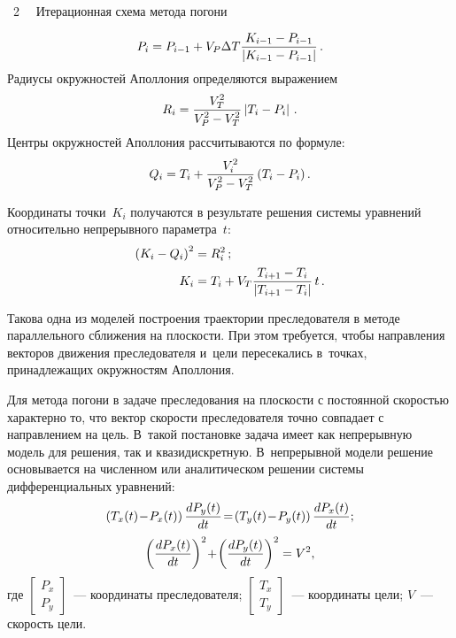    \begin{multicols}{2}
   
   { \begin{center}  %
 \vspace*{-3pt}
     \mbox{%
\epsfxsize=60.497mm
}

\vspace*{6pt}


\noindent
{{\figurename~2}\ \ \small{
Итерационная схема метода погони
}}
\end{center}}

\vspace*{8pt}

\addtocounter{figure}{1}
   
  
   
  \noindent
      $$
  P_i= P_{i-1} +V_P \Delta T \displaystyle\frac{\displaystyle K_{i-1} -P_{i-1}\mathstrut}{\displaystyle \vert K_{i-1} -P_{i-1}\vert\mathstrut}\,.
  $$
    Радиусы окружностей Аполлония определяются выражением
  $$
  R_i= \displaystyle\frac{\displaystyle V_T^2\mathstrut}{\displaystyle V_P^2-V_T^2\mathstrut}\left\vert T_i - P_i\right\vert\,.
  $$
    Центры окружностей Аполлония рассчитываются по формуле:
  $$
  Q_i= T_i +\displaystyle\frac{\displaystyle V_i^2\mathstrut}{\displaystyle V_P^2 -V_T^2\mathstrut}\left( T_i -P_i\right).
  $$
  
  Координаты точки~$K_i$ получаются в результате решения системы 
уравнений относительно непрерывного параметра~$t$:
  \begin{align*}
  \left(K_i-Q_i\right)^2 &=R_i^2\,;\\
  K_i&=T_i +V_T \displaystyle\frac{\displaystyle T_{i+1} -T_i\mathstrut}{\displaystyle \vert T_{i+1} -T_i\vert\mathstrut}\,t\,.
  \end{align*}
  
  Такова одна из моделей построения траектории преследователя в методе 
параллельного сближения на плоскости. При этом требуется, чтобы 
на\-прав\-ле\-ния векторов движения пре\-сле\-до\-ва\-те\-ля и~цели пересекались в~точках, 
при\-над\-ле\-жа\-щих окруж\-но\-стям Аполлония. 
  
  Для метода погони в задаче преследования на плоскости с постоянной 
скоростью характерно то, что вектор скорости преследователя точно совпадает 
с направлением на цель. В~такой постановке задача имеет как непрерывную 
модель для решения, так и квазидискретную. В~непрерывной модели решение 
основывается на численном или аналитическом решении системы 
дифференциальных уравнений:
  \begin{gather}
  \left(T_x(t)\!-\!P_x(t)\right) \fr{dP_y(t)}{dt} \!=\!\left( T_y(t)\!-\!P_y(t)\right) 
\fr{dP_x(t)}{dt};
\label{e1-dub}\\
  \left( \fr{dP_x(t)}{dt}\right)^2 \!+\!\left( \fr{dP_y(t)}{dt}\right)^2 =V^2,
  \label{e2-dub}
  \end{gather}
где $\begin{bmatrix} P_x \\ P_y \end{bmatrix}$~--- координаты преследователя; 
$\begin{bmatrix} T_x\\ T_y \end{bmatrix}$~--- координаты цели; $V$~--- 
скорость цели.


\end{multicols}
